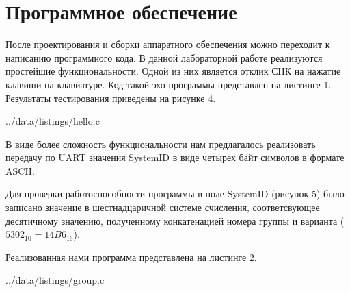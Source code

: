 
\newpage
\section*{Программное обеспечение}

После проектирования и сборки аппаратного обеспечения можно переходит к
написанию программного кода. В данной лабораторной работе реализуются
простейшие функциональности. Одной из них является отклик СНК на нажатие
клавиши на клавиатуре. Код такой эхо-программы представлен на листинге 1.
Результаты тестирования приведены на рисунке 4.

\begin{lstinputlisting}[
	caption={Код эхо-программы приема-передачи по интерфейсу RS232},
	label={lst:echo},
	linerange={1-16}
]{../data/listings/hello.c}
\end{lstinputlisting}


В виде более сложность функциональности нам предлагалось реализовать передачу
по UART значения SystemID в виде четырех байт символов в формате ASCII.

Для проверки работоспособности программы в поле SystemID (рисунок 5) было
записано значение в шестнадцаричной системе счисления, соответсвующее
десятичному значению, полученному конкатенацией номера группы и варианта
($5302_{10} = 14B6_{16}$).


\newpage
Реализованная нами программа представлена на листинге 2.

\begin{lstinputlisting}[
	caption={Код программы, передающей по UART значение SystemID},
	label={lst:group},
	linerange={1-23}
]{../data/listings/group.c}
\end{lstinputlisting}

